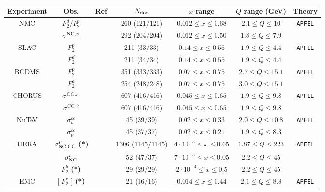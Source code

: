 \begin{table}
\footnotesize
\begin{centering}
      \renewcommand{\arraystretch}{1.4}
  \begin{tabular}{|c|c|c|c|c|c|c|}
\hline
{Experiment} & Obs. & {Ref.}  & $ N_{\rm \bf dat}$ & $x$ range  & $Q$ range (GeV)  & Theory \tabularnewline
\hline
\hline
\multirow{2}{*}{NMC}
&   $F_2^d/F_2^p$ & \cite{Arneodo:1996kd}&   260 (121/121) & $ 0.012\le x \le 0.68$
& $ 2.1 \le Q \le 10 $  &\multirow{2}{*}{\tt APFEL}\tabularnewline
&   $\sigma^{\rm NC,p}$ & \cite{Arneodo:1996qe} & 292 (204/204) &
$0.012 \le x \le 0.50$ & $ 1.8 \le Q \le 7.9 $  &  \tabularnewline
\hline
\multirow{2}{*}{SLAC} &   $F_2^p$ & \cite{Whitlow:1991uw} &  211 (33/33)
& $ 0.14\le x \le 0.55$  &
$ 1.9 \le Q \le 4.4 $  & \multirow{2}{*}{\tt APFEL}\tabularnewline
&   $F_2^d$ & \cite{Whitlow:1991uw}& 211 (34/34) &
$ 0.14 \le x \le 0.55 $ & $ 1.9\le Q \le 4.4 $  & \tabularnewline
\hline
\multirow{2}{*}{BCDMS} &   $F_2^p$ & \cite{bcdms1}&  351 (333/333) & $0.07 \le x \le 0.75$ & $
2.7\le Q \le 15.1 $  &
\multirow{2}{*}{\tt APFEL}\tabularnewline
&   $F_2^d$ & \cite{bcdms2}&  254 (248/248) & $0.07 \le x \le 0.75$ & $ 3.0\le  Q \le
15.1$  & \tabularnewline
\hline
\multirow{2}{*}{CHORUS} &  $\sigma^{\rm CC,\nu}$  & \cite{Onengut:2005kv} & 607 (416/416) &
$0.045 \le x \le 0.65 $  &
$ 1.9\le Q \le 9.8 $  &
\multirow{2}{*}{\tt APFEL} \tabularnewline
&   $\sigma^{\mathrm{CC},\bar{\nu}}$ & \cite{Onengut:2005kv} & 607 (416/416)  & $0.045 \le x \le 0.65$  &
$ 1.9 \le Q \le 9.8 $  & \tabularnewline
\hline
\multirow{2}{*}{NuTeV} &    $\sigma_\nu^{cc}$ & \cite{Goncharov:2001qe,MasonPhD} & 45 (39/39)
&$ 0.02 \le x \le 0.33 $ &
$ 2.0 \le Q \le 10.8  $ 
& \multirow{2}{*}{\tt APFEL} \tabularnewline
&   $\sigma_{\bar{\nu}}^{cc}$ & \cite{Goncharov:2001qe,MasonPhD} & 45 (37/37) &
$ 0.02 \le x \le 0.21$&
$ 1.9 \le Q \le 8.3 $ 
&\tabularnewline
\hline
\multirow{3}{*}{HERA}  &  $\sigma_{\rm NC,CC}^{p}$ {\bf (*)} & \cite{Abramowicz:2015mha}
&  1306 (1145/1145)  & $4\cdot 10^{-5}\le x \le 0.65$ & $ 1.87 \le Q \le 223 $   & \multirow{3}{*}{\tt APFEL}
 \tabularnewline
  & $\sigma_{\rm NC}^{c}$    & \cite{Abramowicz:1900rp} & 52 (47/37) & $7 \cdot 10^{-5} \le x \le 0.05$  & $2.2 \le Q \le 45$  &
 \tabularnewline
 &  $F_2^b$   {\bf (*)} & \cite{Aaron:2009af,Abramowicz:2014zub} & 29 (29/29) & $ 2\cdot 10^{-4}\le x \le
 0.5 $ & $ 2.2 \le Q \le 45$  &
 \tabularnewline
 \hline
 EMC
 &   [ $F_2^c$ ] {\bf (*)}  & \cite{Aubert:1982tt} & 21 (16/16) &$0.014\le x \le 0.44$  & $2.1 \le Q \le 8.8 $ & \tt APFEL

\end{tabular}
\end{centering}
\end{table}

